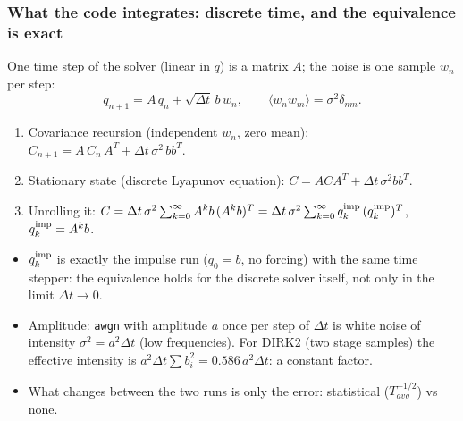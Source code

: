 \documentclass[
  aspectratio=169,
  t,
  onlytextwidth,
  10pt,
]{beamer}
\begin{document}
\begin{frame}
	\frametitle{What the code integrates: discrete time, and the equivalence is exact}
	\small
	One time step of the solver (linear in $q$) is a matrix $A$; the noise is one sample $w_n$ per step:
	\[
		q_{n+1}=A\,q_n+\sqrt{\Delta t}\,b\,w_n,\qquad \langle w_n w_m\rangle=\sigma^2\delta_{nm}.
	\]
	\begin{enumerate}
		\item Covariance recursion (independent $w_n$, zero mean): $C_{n+1}=A\,C_n\,A^T+\Delta t\,\sigma^2\,bb^T$.
		\item Stationary state (discrete Lyapunov equation): $C=ACA^T+\Delta t\,\sigma^2bb^T$.
		\item Unrolling it: \quad $C=\Delta t\,\sigma^2\sum_{k=0}^{\infty}A^k b\,(A^kb)^T=\Delta t\,\sigma^2\sum_{k=0}^{\infty} q^{\rm imp}_k\,(q^{\rm imp}_k)^T$, \quad $q^{\rm imp}_k=A^k b$.
	\end{enumerate}
	\begin{itemize}
		\item $q^{\rm imp}_k$ is exactly the impulse run ($q_0=b$, no forcing) with the same time stepper: the equivalence holds for the discrete solver itself, not only in the limit $\Delta t\to0$.
		\item Amplitude: \texttt{awgn} with amplitude $a$ once per step of $\Delta t$ is white noise of intensity $\sigma^2=a^2\Delta t$ (low frequencies). For DIRK2 (two stage samples) the effective intensity is $a^2\Delta t\sum b_i^2=0.586\,a^2\Delta t$: a constant factor.
		\item What changes between the two runs is only the error: statistical ($T_{avg}^{-1/2}$) vs none.
	\end{itemize}
\end{frame}
\end{document}

